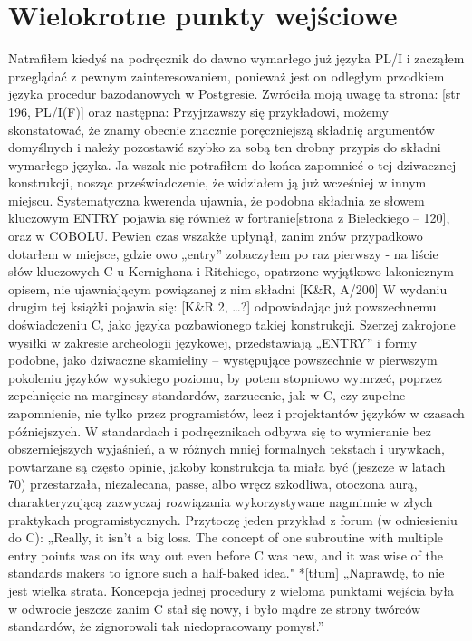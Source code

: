 \section{Wielokrotne punkty wejściowe}
Natrafiłem kiedyś na podręcznik do dawno wymarłego już języka PL/I i zacząłem przeglądać z pewnym zainteresowaniem, ponieważ jest on odległym przodkiem języka procedur bazodanowych w Postgresie. Zwróciła moją uwagę ta strona:
[str 196, PL/I(F)]
oraz następna:
Przyjrzawszy się przykładowi, możemy skonstatować, że znamy obecnie znacznie poręczniejszą składnię argumentów domyślnych i należy pozostawić szybko za sobą ten drobny przypis do składni wymarłego języka. Ja wszak nie potrafiłem do końca zapomnieć o tej dziwacznej konstrukcji, nosząc przeświadczenie, że widziałem ją już wcześniej w innym miejscu. Systematyczna kwerenda ujawnia, że podobna składnia ze słowem kluczowym ENTRY pojawia się również w fortranie[strona z Bieleckiego – 120], oraz w COBOLU. Pewien czas wszakże upłynął, zanim znów przypadkowo dotarłem w miejsce, gdzie owo „entry” zobaczyłem po raz pierwszy -  na liście słów kluczowych C u Kernighana i Ritchiego, opatrzone wyjątkowo lakonicznym opisem, nie ujawniającym powiązanej z nim składni [K\&R, A/200]
W wydaniu drugim tej książki pojawia się: [K\&R 2, …?]
odpowiadając już powszechnemu doświadczeniu C, jako języka pozbawionego takiej konstrukcji.
Szerzej zakrojone wysiłki w zakresie archeologii językowej, przedstawiają „ENTRY” i formy podobne, jako dziwaczne skamieliny – występujące powszechnie w pierwszym pokoleniu języków wysokiego poziomu, by potem stopniowo wymrzeć, poprzez zepchnięcie na marginesy standardów, zarzucenie, jak w C, czy zupełne zapomnienie, nie tylko przez programistów, lecz i projektantów języków w czasach późniejszych. W standardach i podręcznikach odbywa się to wymieranie bez obszerniejszych wyjaśnień, a w różnych mniej formalnych tekstach i urywkach, powtarzane są często opinie, jakoby konstrukcja ta miała być (jeszcze w latach 70) przestarzała, niezalecana,  passe, albo wręcz szkodliwa, otoczona aurą, charakteryzującą zazwyczaj rozwiązania wykorzystywane nagminnie w złych praktykach programistycznych. Przytoczę jeden przykład z forum (w odniesieniu do C):
„Really, it isn't a big loss. The concept of one subroutine with
multiple entry points was on its way out even before C was new, and it
was wise of the standards makers to ignore such a half-baked idea."
*[tłum]
„Naprawdę, to nie jest wielka strata. Koncepcja jednej procedury z wieloma punktami wejścia była w odwrocie jeszcze zanim C stał się nowy, i było mądre ze strony twórców standardów, że zignorowali tak niedopracowany pomysł.” 
 
